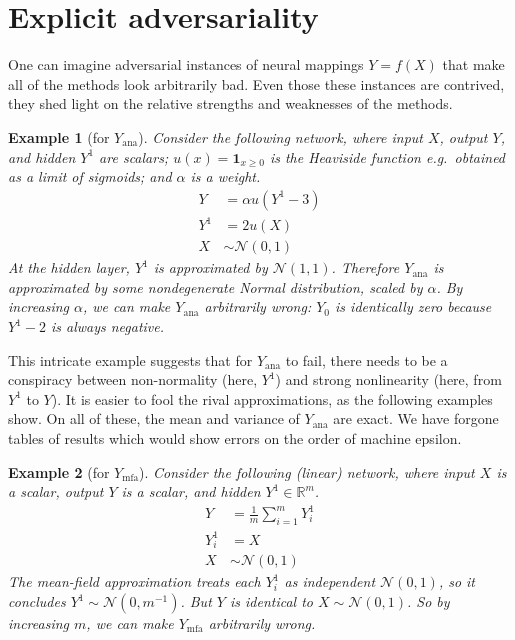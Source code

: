 \documentclass{article}
\newtheorem{example}{Example}
\begin{document}
\section{Explicit adversariality}
One can imagine adversarial instances of neural mappings \(Y=f(X)\) that make all of the methods look arbitrarily bad.
Even those these instances are contrived, they shed light on the relative strengths and weaknesses of the methods.

\begin{example}[for \(Y_\mathrm{ana}\)]
  Consider the following network, where input \(X\), output \(Y\), and hidden \(Y^1\) are scalars; \(u(x) = \bm{1}_{x \geq 0}\) is the Heaviside function e.g.~obtained as a limit of sigmoids; and \(\alpha\) is a weight.
  \begin{align*}
    Y &= \alpha u(Y^1 - 3)
    \\
    Y^1 &= 2 u(X)
    \\
    X &\sim \mathcal N(0, 1)
  \end{align*}
  At the hidden layer, \(Y^1 \) is approximated by \(\mathcal N(1, 1)\).
  Therefore \(Y_\mathrm{ana}\) is approximated by some nondegenerate Normal distribution, scaled by \(\alpha\).
  By increasing \(\alpha\), we can make \(Y_\mathrm{ana}\) arbitrarily wrong:
  \(Y_0\) is identically zero because \(Y^1 -2 \) is always negative.

  
\end{example}

This intricate example suggests that for \(Y_\mathrm{ana}\) to fail, there needs to be a conspiracy between non-normality (here, \(Y^1\)) and strong nonlinearity (here, from \(Y^1\) to \(Y\)).
It is easier to fool the rival approximations, as the following examples show.
On all of these, the mean and variance of \(Y_\mathrm{ana}\) are exact.
We have forgone tables of results which would show errors on the order of machine epsilon.

\begin{example}[for \(Y_\mathrm{mfa}\)]
  Consider the   following (linear) network, where input \(X\) is a scalar, output \(Y\) is a scalar, and hidden \(Y^1\in \mathbb{R}^m\).
  \begin{align*}
    Y &= \frac{1}{m} \sum_{i=1}^m Y^1_i
    \\
    Y^1_i &= X
    \\
    X &\sim \mathcal N(0, 1)
  \end{align*}
  The mean-field approximation treats each \(Y_i^1\) as independent \(\mathcal N(0, 1)\), so it concludes \(Y^1\sim \mathcal N(0, m^{-1})\).
  But \(Y\) is identical to \(X\sim \mathcal N(0, 1)\).
  So by increasing \(m\), we can make \(Y_\mathrm{mfa}\) arbitrarily wrong.
\end{example}
\end{document}

